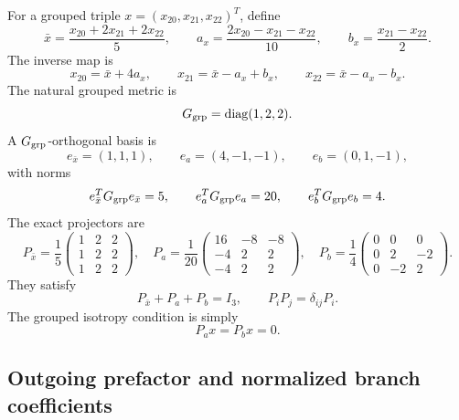 For a grouped triple \(x=(x_{20},x_{21},x_{22})^T\), define
\begin{equation}
\label{eq:part01-bar-a-b}
\bar x=\frac{x_{20}+2x_{21}+2x_{22}}5,
\qquad
a_x=\frac{2x_{20}-x_{21}-x_{22}}{10},
\qquad
b_x=\frac{x_{21}-x_{22}}2.
\end{equation}
The inverse map is
\begin{equation}
\label{eq:part01-inverse-bar-a-b}
\boxed{
x_{20}=\bar x+4a_x,
\qquad
x_{21}=\bar x-a_x+b_x,
\qquad
x_{22}=\bar x-a_x-b_x}.
\end{equation}
The natural grouped metric is
\begin{equation}
G_{\rm grp}=\operatorname{diag}(1,2,2).
\end{equation}
A \(G_{\rm grp}\)-orthogonal basis is
\begin{equation}
e_{\bar x}=(1,1,1),
\qquad
e_a=(4,-1,-1),
\qquad
e_b=(0,1,-1),
\end{equation}
with norms
\begin{equation}
e_{\bar x}^TG_{\rm grp}e_{\bar x}=5,
\qquad
e_a^TG_{\rm grp}e_a=20,
\qquad
e_b^TG_{\rm grp}e_b=4.
\end{equation}
The exact projectors are
\begin{equation}
\label{eq:part01-grouped-projectors}
\boxed{
P_{\bar x}=\frac15
\begin{pmatrix}
1&2&2\\1&2&2\\1&2&2
\end{pmatrix},
\quad
P_a=\frac1{20}
\begin{pmatrix}
16&-8&-8\\-4&2&2\\-4&2&2
\end{pmatrix},
\quad
P_b=\frac14
\begin{pmatrix}
0&0&0\\0&2&-2\\0&-2&2
\end{pmatrix}}.
\end{equation}
They satisfy
\begin{equation}
P_{\bar x}+P_a+P_b=I_3,
\qquad
P_iP_j=\delta_{ij}P_i.
\end{equation}
The grouped isotropy condition is simply
\begin{equation}
\label{eq:part01-isotropy-projector-condition}
P_ax=P_bx=0.
\end{equation}

\subsection{Outgoing prefactor and normalized branch coefficients}
\label{subsec:part01-outgoing-prefactor}

